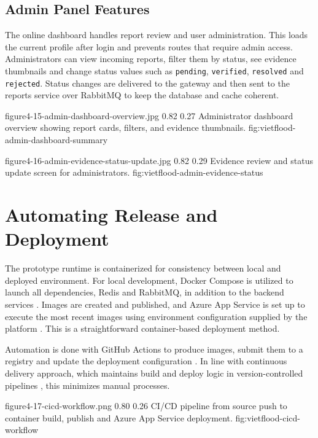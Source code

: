 \FloatBarrier
\subsection{Admin Panel Features}

The online dashboard handles report review and user administration. This loads the current profile after login and prevents routes that require admin access. Administrators can view incoming reports, filter them by status, see evidence thumbnails and change status values such as \texttt{pending}, \texttt{verified}, \texttt{resolved} and \texttt{rejected}. Status changes are delivered to the gateway and then sent to the reports service over RabbitMQ to keep the database and cache coherent.

\vfplaceholderfigure
{figure4-15-admin-dashboard-overview.jpg}
{0.82}
{0.27}
{Administrator dashboard overview showing report cards, filters, and evidence thumbnails.}
{fig:vietflood-admin-dashboard-summary}

\vfplaceholderfigure
{figure4-16-admin-evidence-status-update.jpg}
{0.82}
{0.29}
{Evidence review and status update screen for administrators.}
{fig:vietflood-admin-evidence-status}

\clearpage
\section{Automating Release and Deployment}

The prototype runtime is containerized for consistency between local and deployed environment. For local development, Docker Compose is utilized to launch all dependencies, Redis and RabbitMQ, in addition to the backend services \cite{dockerComposeDocs}. Images are created and published, and Azure App Service is set up to execute the most recent images using environment configuration supplied by the platform \cite{azureAppServiceContainersDocs}. This is a straightforward container-based deployment method.

Automation is done with GitHub Actions to produce images, submit them to a registry and update the deployment configuration \cite{githubActionsDocs}. In line with continuous delivery approach, which maintains build and deploy logic in version-controlled pipelines \cite{humble2010continuousDelivery,kim2016devopsHandbook}, this minimizes manual processes.

\vfplaceholderfigure
{figure4-17-cicd-workflow.png}
{0.80}
{0.26}
{CI/CD pipeline from source push to container build, publish and Azure App Service deployment.}
{fig:vietflood-cicd-workflow}

